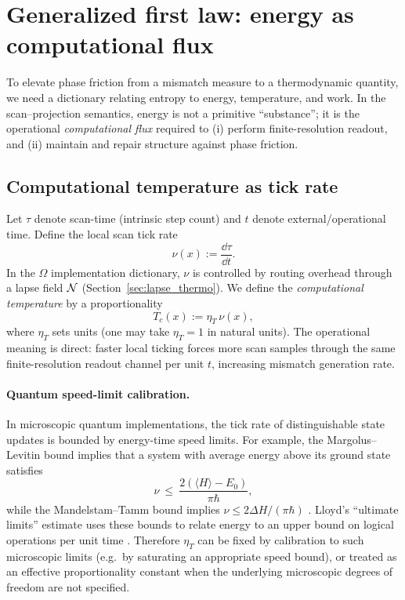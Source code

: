 \section{Generalized first law: energy as computational flux}
\label{sec:first_law}

To elevate phase friction from a mismatch measure to a thermodynamic quantity, we need a dictionary relating entropy to energy, temperature, and work. In the scan--projection semantics, energy is not a primitive ``substance''; it is the operational \emph{computational flux} required to (i) perform finite-resolution readout, and (ii) maintain and repair structure against phase friction.

\subsection{Computational temperature as tick rate}

Let $\tau$ denote scan-time (intrinsic step count) and $t$ denote external/operational time. Define the local scan tick rate
\begin{equation}
\nu(x):=\frac{\dd \tau}{\dd t}.
\end{equation}
In the $\Omega$ implementation dictionary, $\nu$ is controlled by routing overhead through a lapse field $\mathcal{N}$ (Section~\ref{sec:lapse_thermo}). We define the \emph{computational temperature} by a proportionality
\begin{equation}
T_c(x):=\eta_T\,\nu(x),
\end{equation}
where $\eta_T$ sets units (one may take $\eta_T=1$ in natural units). The operational meaning is direct: faster local ticking forces more scan samples through the same finite-resolution readout channel per unit $t$, increasing mismatch generation rate.

\paragraph{Quantum speed-limit calibration.}
In microscopic quantum implementations, the tick rate of distinguishable state updates is bounded by energy-time speed limits. For example, the Margolus--Levitin bound implies that a system with average energy above its ground state satisfies
\begin{equation}
  \nu \ \le\ \frac{2(\langle H\rangle-E_0)}{\pi\hbar},
\end{equation}
while the Mandelstam--Tamm bound implies $\nu\le 2\Delta H/(\pi\hbar)$ \cite{MargolusLevitin1998,MandelstamTamm1945}. Lloyd's ``ultimate limits'' estimate uses these bounds to relate energy to an upper bound on logical operations per unit time \cite{lloyd2000ultimate}. Therefore $\eta_T$ can be fixed by calibration to such microscopic limits (e.g.\ by saturating an appropriate speed bound), or treated as an effective proportionality constant when the underlying microscopic degrees of freedom are not specified.

